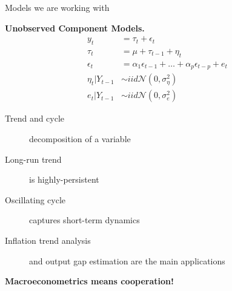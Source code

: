 \documentclass[notes,blackandwhite,mathsans]{beamer}
\begin{document}
\begin{frame}{Models we are working with}

\textbf{Unobserved Component Models.}
\begin{align*}
y_t &= \tau_t + \epsilon_t\\[1ex]
\tau_t &= \mu + \tau_{t-1} + \eta_t \\[1ex]
\epsilon_t &= \alpha_1 \epsilon_{t-1} + \dots +  \alpha_p \epsilon_{t-p} + e_t \\[1ex]
\eta_t|Y_{t-1} &\sim iid\mathcal{N}\left(0,\sigma_\eta^2\right)\\[1ex]
e_t |Y_{t-1} &\sim iid\mathcal{N}\left(0,\sigma_e^2\right)
\end{align*}

\begin{description}
\item[Trend and cycle] {\color{mcxs2}decomposition of a variable} 
\item[Long-run trend] {\color{mcxs2}is highly-persistent} 
\item[Oscillating cycle] {\color{mcxs2}captures short-term dynamics} 
\item[Inflation trend analysis] {\color{mcxs2}and output gap estimation are the main applications}
\end{description}
\end{frame}




{
\begin{frame}{}

\bigskip
\begin{center}
\LARGE\textbf{Macroeconometrics means cooperation!}
\end{center}



\end{frame}
}
\end{document}
